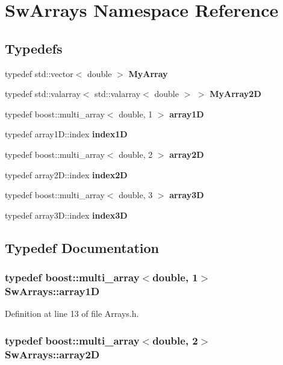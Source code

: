 \section{SwArrays Namespace Reference}
\label{namespaceSwArrays}


\subsection*{Typedefs}
\begin{CompactItemize}
\item 
typedef std::vector$<$ double $>$ {\bf MyArray}
\item 
typedef std::valarray$<$ std::valarray$<$ double $>$ $>$ {\bf MyArray2D}
\item 
typedef boost::multi\_\-array$<$ double, 1 $>$ {\bf array1D}
\item 
typedef array1D::index {\bf index1D}
\item 
typedef boost::multi\_\-array$<$ double, 2 $>$ {\bf array2D}
\item 
typedef array2D::index {\bf index2D}
\item 
typedef boost::multi\_\-array$<$ double, 3 $>$ {\bf array3D}
\item 
typedef array3D::index {\bf index3D}
\end{CompactItemize}


\subsection{Typedef Documentation}
\subsubsection{\setlength{\rightskip}{0pt plus 5cm}typedef boost::multi\_\-array$<$double, 1$>$ {\bf SwArrays::array1D}}\label{namespaceSwArrays_a711e1d51bc667c98e69285d33513165}




Definition at line 13 of file Arrays.h.
\subsubsection{\setlength{\rightskip}{0pt plus 5cm}typedef boost::multi\_\-array$<$double, 2$>$ {\bf SwArrays::array2D}}\label{namespaceSwArrays_2293a5bb6167b46d4664971dffad0f90}




